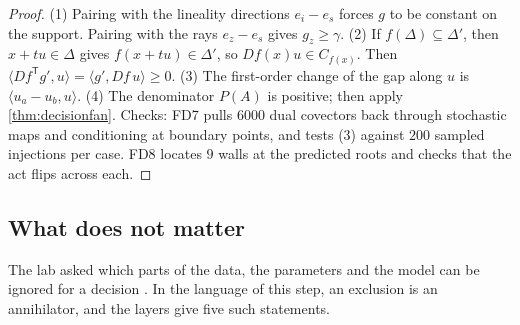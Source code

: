 \documentclass[11pt]{article}
\theoremstyle{definition}\newtheorem{definition}[theorem]{Definition}\newtheorem{remark}[theorem]{Remark}\newtheorem{example}[theorem]{Example}
\begin{document}
\begin{proof}
(1) Pairing with the lineality directions $e_i-e_s$ forces $g$ to be constant on the support. Pairing with the rays $e_z-e_s$ gives $g_z\ge\gamma$. (2)
If $f(\Delta)\subseteq\Delta'$, then $x+tu\in\Delta$ gives $f(x+tu)\in\Delta'$, so $Df(x)u\in C_{f(x)}$. Then
$\langle Df^{\mathsf T}g',u\rangle=\langle g',Df\,u\rangle\ge0$. (3) The first-order change of the gap along $u$ is $\langle u_a-u_b,u\rangle$. (4) The denominator $P(A)$ is
positive; then apply \cref{thm:decisionfan}. Checks: FD7 pulls $6000$ dual covectors back through stochastic maps and conditioning at
boundary points, and tests (3) against $200$ sampled injections per case. FD8 locates $9$ walls at the predicted roots and checks that the
act flips across each.
\end{proof}

\subsection{What does not matter}
The lab asked which parts of the data, the parameters and the model can be ignored for a decision \cite[Section ``What does not
matter'']{Lab}. In the language of this step, an exclusion is an annihilator, and the layers give five such statements.
\end{document}
